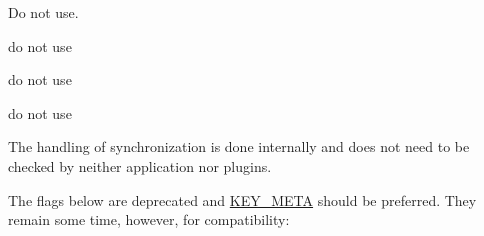 
\begin{DoxyRefList}
\item[Member \mbox{\hyperlink{group__invoke_gaae89e2497eba478be2043f1b25adbb3c}{elektra\+Invoke\+Initialize}} (const char $\ast$elektra\+Plugin\+Name)]\label{deprecated__deprecated000004}%
%
Do not use. 
\item[Member \mbox{\hyperlink{classkdb_1_1tools_1_1Modules_ae8d8c91745c9f517e6e8a556f1664f69}{kdb\+::tools\+::Modules\+::load}} (std\+::string const \&plugin\+Name)]\label{deprecated__deprecated000005}%
%
do not use  
\item[Member \mbox{\hyperlink{classkdb_1_1tools_1_1Modules_a6ae72cc8e30fe3fb0aabd6f78fad8ddf}{kdb\+::tools\+::Modules\+::load}} (std\+::string const \&plugin\+Name, \mbox{\hyperlink{classkdb_1_1KeySet}{kdb\+::\+Key\+Set}} const \&config)]\label{deprecated__deprecated000006}%
%
do not use  
\item[Member \mbox{\hyperlink{group__key_gga9b703ca49f48b482def322b77d3e6bc8ab089c5e7977d6e58737eb586ee153b7f}{KEY\+\_\+\+NULL}} ]\label{deprecated__deprecated000001}%
%
do not use  
\item[Member \mbox{\hyperlink{group__keytest_gaf247df0de7aca04b32ef80e39ef12950}{key\+Need\+Sync}} (const \mbox{\hyperlink{classkdb_1_1Key}{Key}} $\ast$key)]\label{deprecated__deprecated000003}%
%
The handling of synchronization is done internally and does not need to be checked by neither application nor plugins. 
\item[Member \mbox{\hyperlink{group__key_gad23c65b44bf48d773759e1f9a4d43b89}{key\+New}} (const char $\ast$name,...)]\label{deprecated__deprecated000002}%
%
The flags below are deprecated and \mbox{\hyperlink{group__key_gga9b703ca49f48b482def322b77d3e6bc8a040582834bb2d90049947d7ef74e87e2}{KEY\+\_\+\+META}} should be preferred. They remain some time, however, for compatibility\+: 
\end{DoxyRefList}